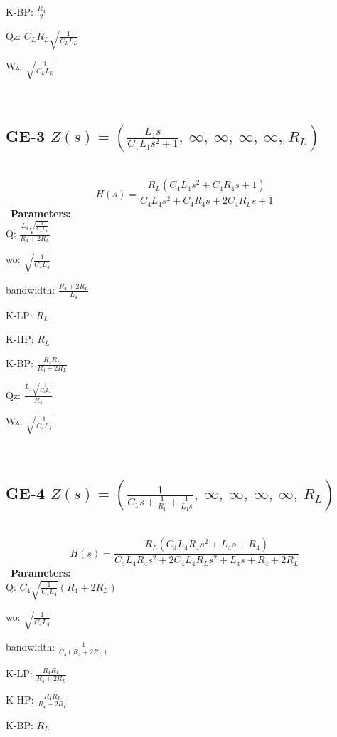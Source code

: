 \documentclass{article}
\begin{document}
K-BP: $\frac{R_{4}}{2}$\ 

Qz: $C_{L} R_{L} \sqrt{\frac{1}{C_{L} L_{L}}}$\ 

Wz: $\sqrt{\frac{1}{C_{L} L_{L}}}$\ 

\ 

\subsection{GE-3 $Z(s) = \left( \frac{L_{1} s}{C_{1} L_{1} s^{2} + 1}, \  \infty, \  \infty, \  \infty, \  \infty, \  R_{L}\right)$ } \ 
\textbf{\[H(s) = \frac{R_{L} \left(C_{4} L_{4} s^{2} + C_{4} R_{4} s + 1\right)}{C_{4} L_{4} s^{2} + C_{4} R_{4} s + 2 C_{4} R_{L} s + 1}\] } \ 
\textbf{Parameters:}\\ 

Q: $\frac{L_{4} \sqrt{\frac{1}{C_{4} L_{4}}}}{R_{4} + 2 R_{L}}$\ 

wo: $\sqrt{\frac{1}{C_{4} L_{4}}}$\ 

bandwidth: $\frac{R_{4} + 2 R_{L}}{L_{4}}$\ 

K-LP: $R_{L}$\ 

K-HP: $R_{L}$\ 

K-BP: $\frac{R_{4} R_{L}}{R_{4} + 2 R_{L}}$\ 

Qz: $\frac{L_{4} \sqrt{\frac{1}{C_{4} L_{4}}}}{R_{4}}$\ 

Wz: $\sqrt{\frac{1}{C_{4} L_{4}}}$\ 

\ 

\subsection{GE-4 $Z(s) = \left( \frac{1}{C_{1} s + \frac{1}{R_{1}} + \frac{1}{L_{1} s}}, \  \infty, \  \infty, \  \infty, \  \infty, \  R_{L}\right)$ } \ 
\textbf{\[H(s) = \frac{R_{L} \left(C_{4} L_{4} R_{4} s^{2} + L_{4} s + R_{4}\right)}{C_{4} L_{4} R_{4} s^{2} + 2 C_{4} L_{4} R_{L} s^{2} + L_{4} s + R_{4} + 2 R_{L}}\] } \ 
\textbf{Parameters:}\\ 

Q: $C_{4} \sqrt{\frac{1}{C_{4} L_{4}}} \left(R_{4} + 2 R_{L}\right)$\ 

wo: $\sqrt{\frac{1}{C_{4} L_{4}}}$\ 

bandwidth: $\frac{1}{C_{4} \left(R_{4} + 2 R_{L}\right)}$\ 

K-LP: $\frac{R_{4} R_{L}}{R_{4} + 2 R_{L}}$\ 

K-HP: $\frac{R_{4} R_{L}}{R_{4} + 2 R_{L}}$\ 

K-BP: $R_{L}$\ 
\end{document}
